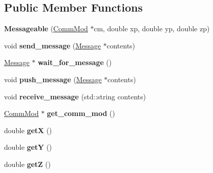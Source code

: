 \subsection*{Public Member Functions}
\begin{DoxyCompactItemize}
\item 
{\bfseries Messageable} (\hyperlink{class_comm_mod}{Comm\+Mod} $\ast$cm, double xp, double yp, double zp)\hypertarget{class_messageable_a17da78cfa69fc760ece179365de9ef23}{}\label{class_messageable_a17da78cfa69fc760ece179365de9ef23}

\item 
void {\bfseries send\+\_\+message} (\hyperlink{class_message}{Message} $\ast$contents)\hypertarget{class_messageable_aaadfd99f6f7a1ec8c8195232a48e3b15}{}\label{class_messageable_aaadfd99f6f7a1ec8c8195232a48e3b15}

\item 
\hyperlink{class_message}{Message} $\ast$ {\bfseries wait\+\_\+for\+\_\+message} ()\hypertarget{class_messageable_acca6e0ec0f301179e9bf5596b5b7d9a7}{}\label{class_messageable_acca6e0ec0f301179e9bf5596b5b7d9a7}

\item 
void {\bfseries push\+\_\+message} (\hyperlink{class_message}{Message} $\ast$contents)\hypertarget{class_messageable_a778d44d8365ed5927bf237d331593809}{}\label{class_messageable_a778d44d8365ed5927bf237d331593809}

\item 
void {\bfseries receive\+\_\+message} (std\+::string contents)\hypertarget{class_messageable_a5e581d6cf3383931bb4749bbbe4d81ee}{}\label{class_messageable_a5e581d6cf3383931bb4749bbbe4d81ee}

\item 
\hyperlink{class_comm_mod}{Comm\+Mod} $\ast$ {\bfseries get\+\_\+comm\+\_\+mod} ()\hypertarget{class_messageable_a600102c71a3398e1ffe181c3e4e680a0}{}\label{class_messageable_a600102c71a3398e1ffe181c3e4e680a0}

\item 
double {\bfseries getX} ()\hypertarget{class_messageable_a95b2cc2dc0f0b5133cf490472b2b13bb}{}\label{class_messageable_a95b2cc2dc0f0b5133cf490472b2b13bb}

\item 
double {\bfseries getY} ()\hypertarget{class_messageable_a202416adb2413f9b5bc33c64ec2bc12e}{}\label{class_messageable_a202416adb2413f9b5bc33c64ec2bc12e}

\item 
double {\bfseries getZ} ()\hypertarget{class_messageable_a7da3f0e2540087aa8933ec4cd99789ce}{}\label{class_messageable_a7da3f0e2540087aa8933ec4cd99789ce}


\end{DoxyCompactItemize}

